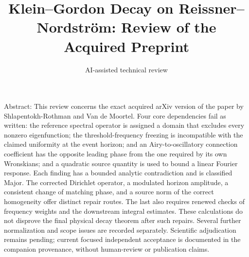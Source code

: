 \documentclass[10pt]{article}
\title{Klein–Gordon Decay on Reissner–Nordström:
Review of the Acquired Preprint}
\author{AI-assisted technical review}
\date{}
\begin{document}
\maketitle
Abstract: This review concerns the exact acquired arXiv version of the paper by Shlapentokh-Rothman and Van de Moortel. Four core dependencies fail as written: the reference spectral operator is assigned a domain that excludes every nonzero eigenfunction; the threshold-frequency freezing is incompatible with the claimed uniformity at the event horizon; and an Airy-to-oscillatory connection coefficient has the opposite leading phase from the one required by its own Wronskians; and a quadratic source quantity is used to bound a linear Fourier response. Each finding has a bounded analytic contradiction and is classified Major. The corrected Dirichlet operator, a modulated horizon amplitude, a consistent change of matching phase, and a source norm of the correct homogeneity offer distinct repair routes. The last also requires renewed checks of frequency weights and the downstream integral estimates. These calculations do not disprove the final physical decay theorem after such repairs. Several further normalization and scope issues are recorded separately. Scientific adjudication remains pending; current focused independent acceptance is documented in the companion provenance, without human-review or publication claims.\par
\end{document}
